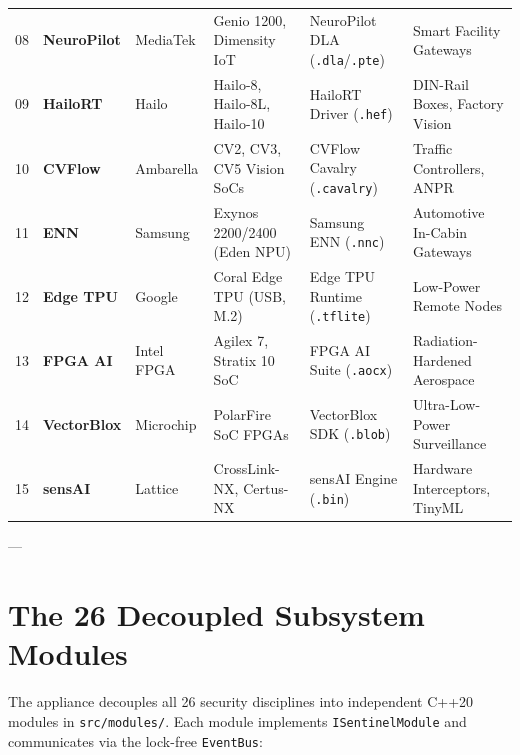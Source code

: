 \documentclass[11pt,a4paper]{article}
\begin{document}
\begin{footnotesize}
\begin{longtable}{@{}p{} p{} p{} p{} p{} p{}@{}}
08 & \textbf{NeuroPilot} & MediaTek & Genio 1200, Dimensity IoT & NeuroPilot DLA (\texttt{.dla}/\texttt{.pte}) & Smart Facility Gateways \\
09 & \textbf{HailoRT} & Hailo & Hailo-8, Hailo-8L, Hailo-10 & HailoRT Driver (\texttt{.hef}) & DIN-Rail Boxes, Factory Vision \\
10 & \textbf{CVFlow} & Ambarella & CV2, CV3, CV5 Vision SoCs & CVFlow Cavalry (\texttt{.cavalry}) & Traffic Controllers, ANPR \\
11 & \textbf{ENN} & Samsung & Exynos 2200/2400 (Eden NPU) & Samsung ENN (\texttt{.nnc}) & Automotive In-Cabin Gateways \\
12 & \textbf{Edge TPU} & Google & Coral Edge TPU (USB, M.2) & Edge TPU Runtime (\texttt{.tflite}) & Low-Power Remote Nodes \\
13 & \textbf{FPGA AI} & Intel FPGA & Agilex 7, Stratix 10 SoC & FPGA AI Suite (\texttt{.aocx}) & Radiation-Hardened Aerospace \\
14 & \textbf{VectorBlox} & Microchip & PolarFire SoC FPGAs & VectorBlox SDK (\texttt{.blob}) & Ultra-Low-Power Surveillance \\
15 & \textbf{sensAI} & Lattice & CrossLink-NX, Certus-NX & sensAI Engine (\texttt{.bin}) & Hardware Interceptors, TinyML \\ \bottomrule
\end{longtable}
\end{footnotesize}

---

\section{The 26 Decoupled Subsystem Modules}
The appliance decouples all 26 security disciplines into independent C++20 modules in \texttt{src/modules/}. Each module implements \texttt{ISentinelModule} and communicates via the lock-free \texttt{EventBus}:
\end{document}
